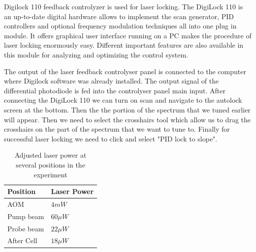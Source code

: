 Digilock 110 feedback controlyzer is used for laser locking. The DigiLock 110 is an up-to-date digital hardware allows to implement the scan generator, PID controllers and optional frequency modulation techniques all into one plug in module. It offers graphical user interface running on a PC makes the procedure of laser locking enormously easy. Different important features are also available in this module for analyzing and optimizing the control system.
 
The output of the laser feedback controlyser panel is connected to the computer where Digilock software was already installed. The output signal of the differential photodiode is fed into the controlyser panel main input. After connecting the DigiLock 110 we can turn on scan and navigate to the autolock screen at the bottom. Then the the portion of the spectrum that we tuned earlier will appear. Then we need to select the crosshairs tool which allow us to drag the crosshairs on the part of the spectrum that we want to tune to. Finally for successful laser locking we need to click and select "PID lock to slope".
\begin{table}[h]
\centering
\begin{tabular}{|l | l|}
\hline

\textbf{ Position}    & \textbf{Laser Power} \\
\hline

AOM &   $4mW$  \\

Pump beam   &    $60\mu W$  \\

Probe beam   &    $22\mu W$  \\
After Cell  &      $18\mu W$   \\

\hline
\end{tabular}
\caption{Adjusted laser power at several positions in the experiment}
\end{table}
